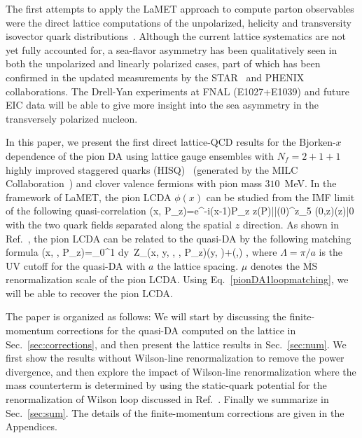 The first attempts to apply the LaMET approach to compute parton observables were the direct lattice computations of the unpolarized, helicity and transversity isovector quark distributions~\cite{Lin:2014gaa,Lin:2014yra,Lin:2014zya,Alexandrou:2015rja,Chen:2016utp,Alexandrou:2016jqi}. 
Although the current lattice systematics are not yet fully accounted for, a sea-flavor asymmetry has been qualitatively seen in both the unpolarized and linearly polarized cases, part of which 
has been confirmed in the updated measurements by the STAR~\cite{Adamczyk:2014xyw} and PHENIX~\cite{Adare:2015gsd}
collaborations. The Drell-Yan experiments at FNAL (E1027+E1039) and future EIC data will be able to give more insight into the sea asymmetry in the transversely polarized nucleon. 

In this paper, we present the first direct lattice-QCD results for the Bjorken-$x$ dependence  of the pion DA 
using lattice gauge ensembles with $N_f=2+1+1$ highly improved staggered
quarks (HISQ)~\cite{Follana:2006rc} (generated by the MILC Collaboration~\cite{Bazavov:2012xda}) and clover valence fermions with pion mass $310$~MeV.
%
In the framework of LaMET, the pion LCDA $\phi(x)$ can be studied from the IMF limit of the following quasi-correlation 
\beq\label{quasiDA}
{\tilde \phi}(x, P_z)={}\int{}e^{-i(x-1)P_z z}\langle \pi(P)|\bar\psi(0)\gamma^z\gamma_5 \Gamma(0,z)\psi(z)|0\rangle
\eeq
with the two quark fields separated along the spatial $z$ direction. As shown in Ref.~\cite{Ji:2015qla}, the pion LCDA can be related to the quasi-DA by the following matching formula
\beq\label{pionDA1loopmatching}
{\tilde \phi}(x, \Lambda, P_z)=\int_0^1 dy\, Z_\phi(x, y, \Lambda, \mu, P_z)\phi(y, \mu)+\left(,\right) ,
\eeq
where $\Lambda=\pi/a$ is the UV cutoff for the quasi-DA with $a$ the lattice spacing. $\mu$ denotes the $\overline{\text{MS}}$ renormalization scale of the pion LCDA. Using Eq.~\ref{pionDA1loopmatching}, we will be able to recover the pion LCDA.

The paper is organized as follows: We will 
start by discussing the finite-momentum corrections for the quasi-DA computed on the lattice in Sec.~\ref{sec:corrections}, and then present the lattice results in Sec.~\ref{sec:num}. We first show the results without Wilson-line renormalization to remove the power divergence, and then explore the impact of Wilson-line renormalization where the mass counterterm is determined by using the static-quark potential for the renormalization of Wilson loop discussed in Ref.~\cite{Musch:2010ka}. Finally we summarize in Sec.~\ref{sec:sum}. The details of the finite-momentum corrections are given in the Appendices.

